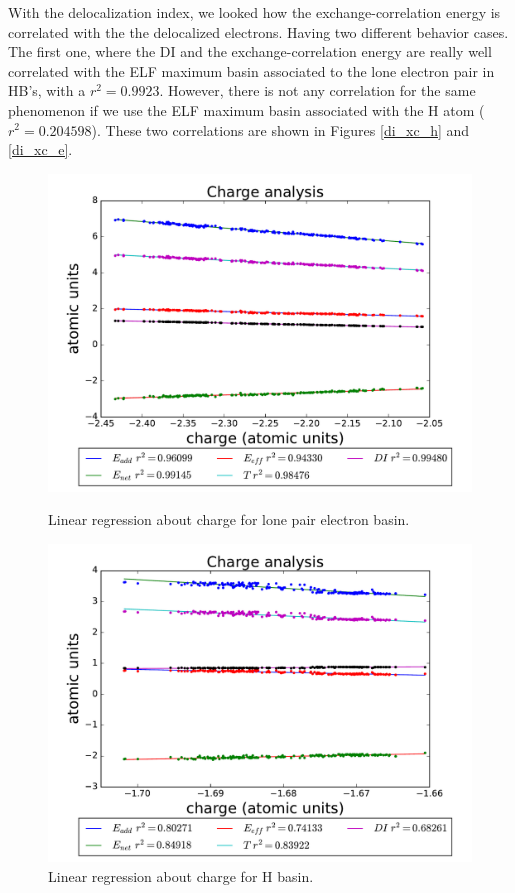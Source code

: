 With the delocalization index, we looked how the exchange-correlation energy
is correlated with the the delocalized electrons.
Having two different behavior cases. The first
one, where the DI and the exchange-correlation energy are really well
correlated with the ELF maximum basin associated to the lone electron pair in
HB's, with a $r^2 = 0.9923$. However, there is not any correlation for the same
phenomenon if we use the ELF maximum basin associated with the H atom ($r^2 =
0.204598$). These two correlations are shown in Figures \ref{di_xc_h} and
\ref{di_xc_e}.

\begin{figure}[b!]
    \begin{minipage}[t]{0.48\textwidth}
      \centering
      \includegraphics[width=\textwidth]{4/plots/promelf/charge/chargee.pdf}
      \caption{Linear regression about charge for lone pair electron basin.}
      \label{rl_chargee}
    \end{minipage}%
    \hfill
    \begin{minipage}[t]{0.48\textwidth}
      \centering
      \includegraphics[width=\textwidth]{4/plots/promelf/charge/chargeH.pdf}
      \caption{Linear regression about charge for H basin.}
      \label{rl_chargeH}
    \end{minipage}%
\end{figure}

